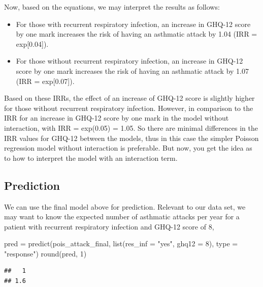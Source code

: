 \documentclass[
  10pt,
]{krantz}
\newenvironment{Shaded}{\begin{snugshade}}{\end{snugshade}}
\newcommand{\AttributeTok}[1]{\textcolor[rgb]{0.77,0.63,0.00}{#1}}
\newcommand{\DecValTok}[1]{\textcolor[rgb]{0.00,0.00,0.81}{#1}}
\newcommand{\FunctionTok}[1]{\textcolor[rgb]{0.00,0.00,0.00}{#1}}
\newcommand{\NormalTok}[1]{#1}
\newcommand{\OtherTok}[1]{\textcolor[rgb]{0.56,0.35,0.01}{#1}}
\newcommand{\StringTok}[1]{\textcolor[rgb]{0.31,0.60,0.02}{#1}}
\providecommand{\tightlist}{%
  \setlength{\itemsep}{0pt}\setlength{\parskip}{0pt}}
\begin{document}
Now, based on the equations, we may interpret the results as follows:

\begin{itemize}
\tightlist
\item
  For those with recurrent respiratory infection, an increase in GHQ-12 score by one mark increases the risk of having an asthmatic attack by 1.04 (IRR = exp{[}0.04{]}).
\item
  For those without recurrent respiratory infection, an increase in GHQ-12 score by one mark increases the risk of having an asthmatic attack by 1.07 (IRR = exp{[}0.07{]}).
\end{itemize}

Based on these IRRs, the effect of an increase of GHQ-12 score is slightly higher for those without recurrent respiratory infection. However, in comparison to the IRR for an increase in GHQ-12 score by one mark in the model without interaction, with IRR = exp(0.05) = 1.05. So there are minimal differences in the IRR values for GHQ-12 between the models, thus in this case the simpler Poisson regression model without interaction is preferable. But now, you get the idea as to how to interpret the model with an interaction term.

\hypertarget{prediction-2}{%
\subsection{Prediction}\label{prediction-2}}

We can use the final model above for prediction. Relevant to our data set, we may want to know the expected number of asthmatic attacks per year for a patient with recurrent respiratory infection and GHQ-12 score of 8,

\begin{Shaded}
\begin{Highlighting}[]
\NormalTok{pred }\OtherTok{=} \FunctionTok{predict}\NormalTok{(pois\_attack\_final, }\FunctionTok{list}\NormalTok{(}\AttributeTok{res\_inf =} \StringTok{"yes"}\NormalTok{, }\AttributeTok{ghq12 =} \DecValTok{8}\NormalTok{), }
               \AttributeTok{type =} \StringTok{"response"}\NormalTok{)}
\FunctionTok{round}\NormalTok{(pred, }\DecValTok{1}\NormalTok{)}
\end{Highlighting}
\end{Shaded}

\begin{verbatim}
##   1 
## 1.6
\end{verbatim}
\end{document}
